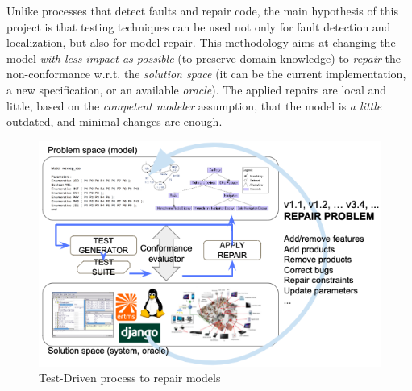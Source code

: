 \documentclass[
12pt, %
oneside, %
english, %
singlespacing, %
headsepline, %
consistentlayout, %
]{MastersDoctoralThesis} %
\theoremstyle{plain}
\theoremstyle{definition}
\theoremstyle{remark}
\theoremstyle{remark}
\theoremstyle{plain}
\theoremstyle{plain}
\theoremstyle{remark}
\begin{document}
Unlike processes that detect faults and repair code, %
the main hypothesis of this project is that testing techniques can be used not only for fault detection and localization, but also for model repair.
This methodology aims at changing the model \textit{with less impact as possible} (to preserve domain knowledge) to \textit{repair} the non-conformance w.r.t. the \textit{solution space} (it can be the current implementation, a new specification, or an available \textit{oracle}).
The applied repairs are local and little, based on the \textit{competent modeler} assumption, that the model is \textit{a little} outdated, and minimal changes are enough. 

\begin{figure}[!tb]
	\centering
	\includegraphics[width=.8\columnwidth]{images/repair.png}
	\caption{Test-Driven process to repair models}
	\label{fig:approach}
\end{figure}

\end{document}
